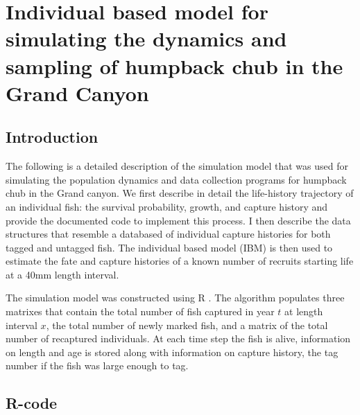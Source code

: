 \section{Individual based model for simulating the dynamics and sampling of humpback chub in the Grand Canyon}

\subsection{Introduction}
The following is a detailed description of the simulation model that was used for simulating the population dynamics and data collection programs for humpback chub in the Grand canyon. We first describe in detail the life-history trajectory of an individual fish: the survival probability, growth, and capture history and provide the documented code to implement this process. I then describe the data structures that resemble a databased of individual capture histories for both tagged and untagged fish.   The individual based model (IBM) is then used to estimate the fate and capture histories of a known number of recruits starting life at a 40mm length interval.

The simulation model was constructed using R \citep{R-Development-Core-Team:2009fk}.  The algorithm populates three matrixes that contain the total number of fish captured in year $t$ at length interval $x$, the total number of newly marked fish, and a matrix of the total number of recaptured individuals.  At each time step the fish is alive, information on length and age is stored along with information on capture history, the tag number if the fish was large enough to tag.

\subsection{R-code}
